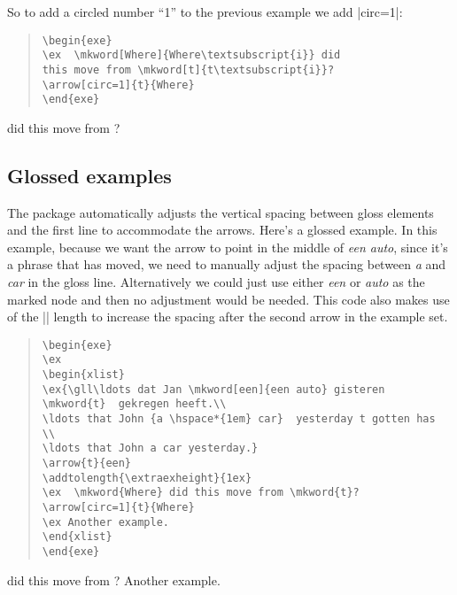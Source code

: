 \documentclass[11pt]{article}
\begin{document}
So to add a circled number “1” to the previous example we add |circ=1|:

\begin{quote}
\begin{lstlisting}
\begin{exe}
\ex  \mkword[Where]{Where\textsubscript{i}} did 
this move from \mkword[t]{t\textsubscript{i}}?
\arrow[circ=1]{t}{Where}
\end{exe}
\end{lstlisting}
\end{quote}

\begin{exe}
\ex  {} did 
this move from ?
\end{exe}
\subsection{Glossed examples}
The package automatically adjusts the vertical spacing between gloss elements and the first line to accommodate the arrows. Here’s a glossed example. In this example, because we want the arrow to point in the middle of \emph{een auto}, since it’s a phrase that has moved, we need to manually adjust the spacing between \emph{a} and \emph{car} in the gloss line. Alternatively we could just use either \emph{een} or \emph{auto} as the marked node and then no adjustment would be needed. This code also makes use of the |\extraexheight| length to increase the spacing after the second arrow in the example set.
\clearpage
\begin{quote}
\begin{lstlisting}
\begin{exe}
\ex
\begin{xlist}
\ex{\gll\ldots dat Jan \mkword[een]{een auto} gisteren \mkword{t}  gekregen heeft.\\
\ldots that John {a \hspace*{1em} car}  yesterday t gotten has \\
\ldots that John a car yesterday.}
\arrow{t}{een}
\addtolength{\extraexheight}{1ex}
\ex  \mkword{Where} did this move from \mkword{t}?
\arrow[circ=1]{t}{Where}
\ex Another example.
\end{xlist}
\end{exe}
\end{lstlisting}
\end{quote}

\begin{exe}
\ex
\begin{xlist}
\addtolength{\extraexheight}{1ex}
\ex  {} did this move from ?
\ex Another example.
\end{xlist}
\end{exe}
\end{document}
